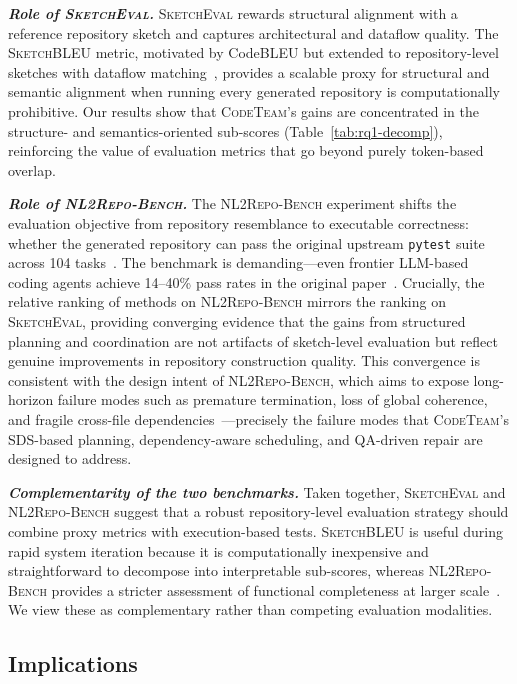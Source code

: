 \documentclass[format=acmsmall, review=false, screen=true]{acmart}
\newcommand{\fakesection}[2][1em]{\vspace{#1}\noindent\textit{\textbf{#2}}}
\newcommand{\tool}{\textsc{CodeTeam}\xspace}
\newcommand{\sketcheval}{\textsc{SketchEval}\xspace}
\newcommand{\sketchbleu}{\textsc{SketchBLEU}\xspace}
\newcommand{\nlrepobench}{\textsc{NL2Repo-Bench}\xspace}
\begin{document}
\fakesection{Role of \sketcheval.}
\sketcheval rewards structural alignment with a reference repository sketch and captures architectural and dataflow quality.
The \sketchbleu metric, motivated by CodeBLEU but extended to repository-level sketches with dataflow matching~\cite{Ren2020CodeBLEU,Zan2025CodeS}, provides a scalable proxy for structural and semantic alignment when running every generated repository is computationally prohibitive.
Our results show that \tool's gains are concentrated in the structure- and semantics-oriented sub-scores (Table~\ref{tab:rq1-decomp}), reinforcing the value of evaluation metrics that go beyond purely token-based overlap.

\fakesection{Role of \nlrepobench.}
The \nlrepobench experiment shifts the evaluation objective from repository resemblance to executable correctness: whether the generated repository can pass the original upstream \texttt{pytest} suite across 104 tasks~\cite{Zan2025CodeS,Ding2025NL2RepoBench}.
The benchmark is demanding---even frontier LLM-based coding agents achieve 14--40\% pass rates in the original paper~\cite{Ding2025NL2RepoBench}.
Crucially, the relative ranking of methods on \nlrepobench mirrors the ranking on \sketcheval, providing converging evidence that the gains from structured planning and coordination are not artifacts of sketch-level evaluation but reflect genuine improvements in repository construction quality.
This convergence is consistent with the design intent of \nlrepobench, which aims to expose long-horizon failure modes such as premature termination, loss of global coherence, and fragile cross-file dependencies~\cite{Ding2025NL2RepoBench}---precisely the failure modes that \tool's SDS-based planning, dependency-aware scheduling, and QA-driven repair are designed to address.

\fakesection{Complementarity of the two benchmarks.}
Taken together, \sketcheval and \nlrepobench suggest that a robust repository-level evaluation strategy should combine proxy metrics with execution-based tests.
\sketchbleu is useful during rapid system iteration because it is computationally inexpensive and straightforward to decompose into interpretable sub-scores, whereas \nlrepobench provides a stricter assessment of functional completeness at larger scale~\cite{Zan2025CodeS,Ding2025NL2RepoBench}.
We view these as complementary rather than competing evaluation modalities.

\subsection{Implications}
\label{subsec:disc-imp}
\end{document}
